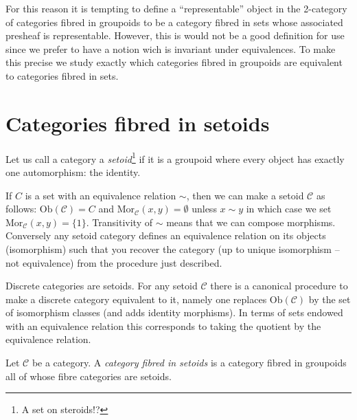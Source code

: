 \noindent
For this reason it is tempting to define a ``representable'' object in the
2-category of categories fibred in groupoids to be a category fibred in
sets whose associated presheaf is representable. However, this is would not
be a good definition for use since we prefer to have a notion wich is
invariant under equivalences. To make this precise we study exactly
which categories fibred in groupoids are equivalent to categories
fibred in sets.









\section{Categories fibred in setoids}
\label{section-fibred-in-setoids}

\begin{definition}
\label{definition-setoid}
Let us call a category a {\it setoid}\footnote{A set on steroids!?}
if it is a groupoid where every object
has exactly one automorphism: the identity.
\end{definition}

\noindent
If $C$ is a set with an equivalence relation $\sim$, then we can make a setoid
$\mathcal{C}$ as follows: $\text{Ob}(\mathcal{C}) = C$ and
$\text{Mor}_\mathcal{C}(x, y) = \emptyset$ unless $x \sim y$ in which
case we set $\text{Mor}_\mathcal{C}(x, y) = \{1\}$. Transitivity of
$\sim$ means that we can compose morphisms. Conversely any setoid
category defines an equivalence relation on its objects (isomorphism)
such that you recover the category (up to unique isomorphism -- not
equivalence) from the procedure just described.

\medskip\noindent
Discrete categories are setoids. For any setoid $\mathcal{C}$ there is a
canonical procedure to make a discrete category equivalent to it, namely
one replaces $\text{Ob}(\mathcal{C})$ by the set of isomorphism
classes (and adds identity morphisms). In terms of sets endowed
with an equivalence relation this corresponds to taking the quotient
by the equivalence relation.

\begin{definition}
\label{definition-category-fibred-setoids}
Let $\mathcal{C}$ be a category. A {\it category fibred in setoids}
is a category fibred in groupoids all of whose fibre categories are
setoids.
\end{definition}

